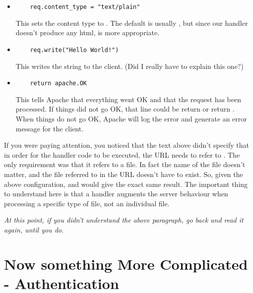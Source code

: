\begin{enumerate}
\begin{itemize}
\item
\begin{verbatim}
    req.content_type = "text/plain"
\end{verbatim}

This sets the content type to . The default is usually
, but since our handler doesn't produce any html,
 is more appropriate.

\item
\begin{verbatim}
    req.write("Hello World!")
\end{verbatim}

This writes the  string to the client. (Did I really
have to explain this one?)

\item
\begin{verbatim}
    return apache.OK
\end{verbatim}

This tells Apache that everything went OK and that the request has
been processed. If things did not go OK, that line could be return
 or return
. When things do not go OK, Apache
will log the error and generate an error message for the client.
\end{itemize}
\end{enumerate}

 If you were paying attention, you
noticed that the text above didn't specify that in order for the
handler code to be executed, the URL needs to refer to
. The only requirement was that it refers to a
 file. In fact the name of the file doesn't matter, and
the file referred to in the URL doesn't have to exist. So, given the
above configuration,  and
 would give the exact
same result. The important thing to understand here is that a handler
augments the server behaviour when processing a specific type of file,
not an individual file. 

\emph{At this point, if you didn't understand the above paragraph, go
back and read it again, until you do.}

\section{Now something More Complicated - Authentication\label{tut-more-complicated}}

